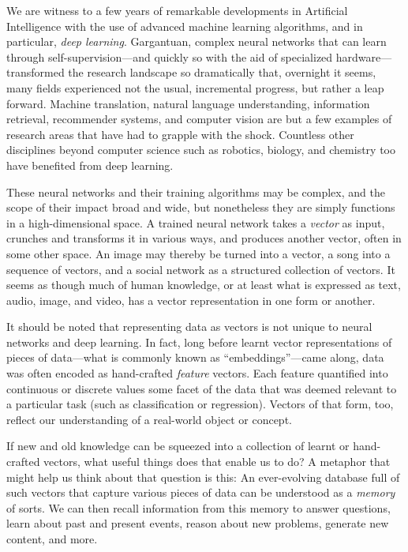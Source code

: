 \preface
{}

We are witness to a few years of remarkable developments
in Artificial Intelligence with the use of advanced machine learning algorithms,
and in particular, \emph{deep learning}. Gargantuan, complex neural networks
that can learn through self-supervision---and quickly so with the aid of specialized
hardware---transformed the research landscape so dramatically that, overnight it seems,
many fields experienced not the usual, incremental progress, but rather a leap forward.
Machine translation, natural language understanding, information retrieval,
recommender systems, and computer vision are but a
few examples of research areas that have had to grapple with the shock.
Countless other disciplines beyond computer science such as robotics, biology, and chemistry
too have benefited from deep learning.

These neural networks and their training algorithms may be complex, and
the scope of their impact broad and wide,
but nonetheless they are simply functions in a high-dimensional space.
A trained neural network takes a \emph{vector} as input, crunches and transforms
it in various ways, and produces another vector, often in some other space.
An image may thereby be turned into a vector, a song into a sequence of vectors,
and a social network as a structured collection of vectors.
It seems as though much of human knowledge,
or at least what is expressed as text, audio, image, and video,
has a vector representation in one form or another.

It should be noted that representing data as vectors is not unique to neural networks
and deep learning. In fact, long before learnt vector representations of pieces of
data---what is commonly known as ``embeddings''---came along, data
was often encoded as hand-crafted \emph{feature} vectors. Each feature quantified
into continuous or discrete values some facet of the
data that was deemed relevant to a particular task (such as classification or regression).
Vectors of that form, too, reflect
our understanding of a real-world object or concept.

If new and old knowledge can be squeezed into a collection of
learnt or hand-crafted vectors, what useful things does that enable us to do?
A metaphor that might help us think about that question is this:
An ever-evolving database full of such vectors that capture
various pieces of data can be understood as a \emph{memory} of sorts.
We can then recall information from this memory to answer questions,
learn about past and present events, reason about new problems,
generate new content, and more.

